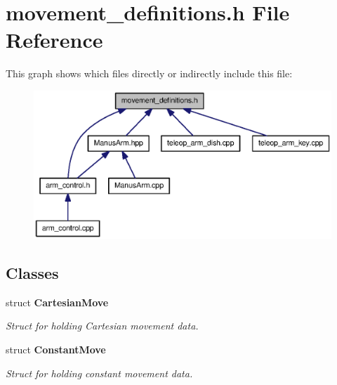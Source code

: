 \section{movement\-\_\-definitions.\-h \-File \-Reference}
\label{movement__definitions_8h}
\-This graph shows which files directly or indirectly include this file\-:\nopagebreak
\begin{figure}[H]
\begin{center}
\leavevmode
\includegraphics[width=350pt]{movement__definitions_8h__dep__incl}
\end{center}
\end{figure}
\subsection*{\-Classes}
\begin{DoxyCompactItemize}
\item 
struct {\bf \-Cartesian\-Move}
\begin{DoxyCompactList}\small\item\em \-Struct for holding \-Cartesian movement data. \end{DoxyCompactList}\item 
struct {\bf \-Constant\-Move}
\begin{DoxyCompactList}\small\item\em \-Struct for holding constant movement data. \end{DoxyCompactList}\end{DoxyCompactItemize}
